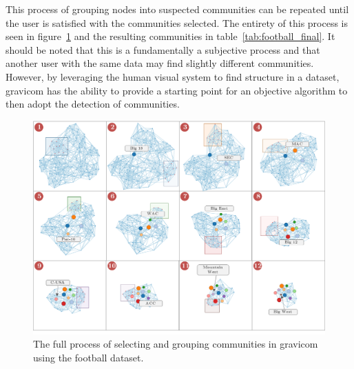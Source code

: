 \documentclass{article}\usepackage[]{graphicx}\usepackage[]{color}
\begin{document}
This process of grouping nodes into suspected communities can be repeated until the user is satisfied with the communities selected. The entirety of this process is seen in figure~\ref{fig:football_progression} and the resulting communities in table~\ref{tab:football_final}. It should be noted that this is a fundamentally a subjective process and that another user with the same data may find slightly different communities. However, by leveraging the human visual system to find structure in a dataset, gravicom has the ability to provide a starting point for an objective algorithm to then adopt the detection of communities. 

\begin{figure}[H]
\centering
\includegraphics[width=\textwidth]{images/football_progression.png}
\caption{\label{fig:football_progression}The full process of selecting and grouping communities in gravicom using the football dataset.}
\end{figure}
\end{document}

